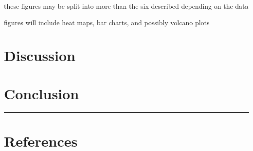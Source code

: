 \documentclass[
  letterpaper,
  DIV=11,
  numbers=noendperiod]{scrartcl}
\begin{document}
these figures may be split into more than the six described depending on
the data

figures will include heat maps, bar charts, and possibly volcano plots

\section{Discussion}\label{discussion}

\section{Conclusion}\label{conclusion}

\begin{center}\rule{0.5\linewidth}{0.5pt}\end{center}

\section*{References}\label{references}
\end{document}
